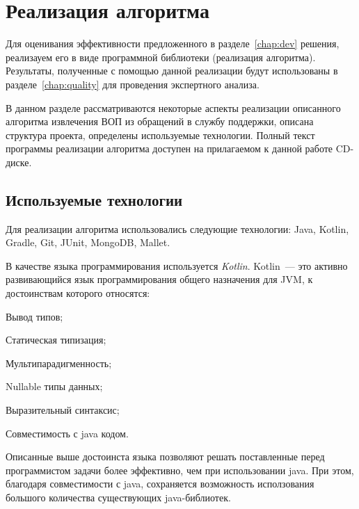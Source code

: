 \chapter{Реализация алгоритма}
\label{chap:impl}

Для оценивания эффективности предложенного в разделе~\ref{chap:dev} решения, реализауем его в виде программной библиотеки (реализация алгоритма). Результаты, полученные с помощью данной реализации будут использованы в разделе~\ref{chap:quality} для проведения экспертного анализа.

В данном разделе рассматриваются некоторые аспекты реализации описанного алгоритма извлечения ВОП из обращений в службу поддержки, описана структура проекта, определены используемые технологии. Полный текст программы  реализации алгоритма доступен на прилагаемом к данной работе CD-диске.

\section{Используемые технологии}
Для реализации алгоритма использовались следующие технологии: Java, Kotlin, Gradle, Git, JUnit, MongoDB, Mallet.

В качестве языка программирования используется \textit{Kotlin}. Kotlin~--- это активно развивающийся язык программирования общего назначения для JVM, к достоинствам которого относятся:


\begin{itemize*}
\item Вывод типов;
\item Статическая типизация;
\item Мультипарадигменность;
\item Nullable типы данных;
\item Выразительный синтаксис;
\item Совместимость с java кодом.
\end{itemize*}

Описанные выше достоинста языка позволяют решать поставленные перед программистом задачи более эффективно, чем при использовании java. При этом, благодаря совместимости с java, сохраняется возможность исползования большого количества существующих java-библиотек.

